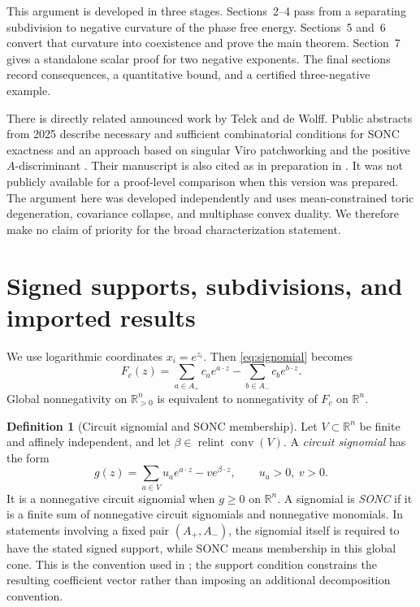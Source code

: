 \documentclass[11pt]{article}
\theoremstyle{plain}
\theoremstyle{definition}
\newtheorem{definition}[theorem]{Definition}
\theoremstyle{remark}
\newcommand{\R}{\mathbb R}
\newcommand{\conv}{\operatorname{conv}}
\newcommand{\relint}{\operatorname{relint}}
\begin{document}
This argument is developed in three stages. Sections~2--4 pass from a separating subdivision to negative curvature of the phase free energy. Sections~5 and~6 convert that curvature into coexistence and prove the main theorem. Section~7 gives a standalone scalar proof for two negative exponents. The final sections record consequences, a quantitative bound, and a certified three-negative example.

There is directly related announced work by Telek and de Wolff. Public abstracts from 2025 describe necessary and sufficient combinatorial conditions for SONC exactness and an approach based on singular Viro patchworking and the positive $A$-discriminant \cite{TelekKonstanz,TelekSIAM}. Their manuscript is also cited as in preparation in \cite{FFT}. It was not publicly available for a proof-level comparison when this version was prepared. The argument here was developed independently and uses mean-constrained toric degeneration, covariance collapse, and multiphase convex duality. We therefore make no claim of priority for the broad characterization statement.

\section{Signed supports, subdivisions, and imported results}

We use logarithmic coordinates $x_i=e^{z_i}$. Then \eqref{eq:signomial} becomes
\[
 F_c(z)=\sum_{a\in A_+}c_a e^{a\cdot z}-\sum_{b\in A_-}c_b e^{b\cdot z}.
\]
Global nonnegativity on $\R_{>0}^n$ is equivalent to nonnegativity of $F_c$ on $\R^n$.

\begin{definition}[Circuit signomial and SONC membership]
Let $V\subset\R^n$ be finite and affinely independent, and let $\beta\in\relint\conv(V)$. A \emph{circuit signomial} has the form
\[
 g(z)=\sum_{a\in V}u_a e^{a\cdot z}-v e^{\beta\cdot z},
 \qquad u_a>0,\ v>0.
\]
It is a nonnegative circuit signomial when $g\ge0$ on $\R^n$. A signomial is \emph{SONC} if it is a finite sum of nonnegative circuit signomials and nonnegative monomials. In statements involving a fixed pair $(A_+,A_-)$, the signomial itself is required to have the stated signed support, while SONC means membership in this global cone. This is the convention used in \cite[Section~3.2]{FFT}; the support condition constrains the resulting coefficient vector rather than imposing an additional decomposition convention.
\end{definition}
\end{document}
